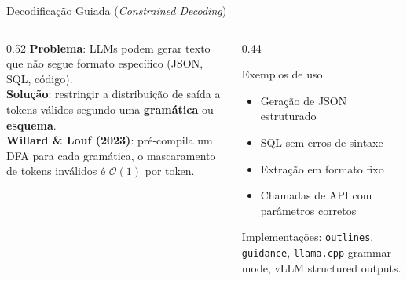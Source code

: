 \documentclass[aspectratio=169, xcolor=dvipsnames]{beamer}
\begin{document}
  \begin{frame}{Decodificação Guiada (\textit{Constrained Decoding}) \cite{willard2023guided}}
    \begin{columns}[T]
      \begin{column}{0.52\textwidth}
        \textbf{Problema}: LLMs podem gerar texto que não segue formato específico (JSON, SQL, código).\\[0.4em]
        \textbf{Solução}: restringir a distribuição de saída a tokens válidos segundo uma \textbf{gramática} ou \textbf{esquema}.\\[0.4em]
        \textbf{Willard \& Louf (2023)}: pré-compila um DFA para cada gramática, o mascaramento de tokens inválidos é $\mathcal{O}(1)$ por token.
      \end{column}
      \begin{column}{0.44\textwidth}
        \begin{block}{Exemplos de uso}
          \begin{itemize}
            \item Geração de JSON estruturado
            \item SQL sem erros de sintaxe
            \item Extração em formato fixo
            \item Chamadas de API com parâmetros corretos
          \end{itemize}
        \end{block}
        \vspace{0.2em}
        Implementações: \texttt{outlines}, \texttt{guidance}, \texttt{llama.cpp} grammar mode, vLLM structured outputs.
      \end{column}
    \end{columns}
  \end{frame}
\end{document}
